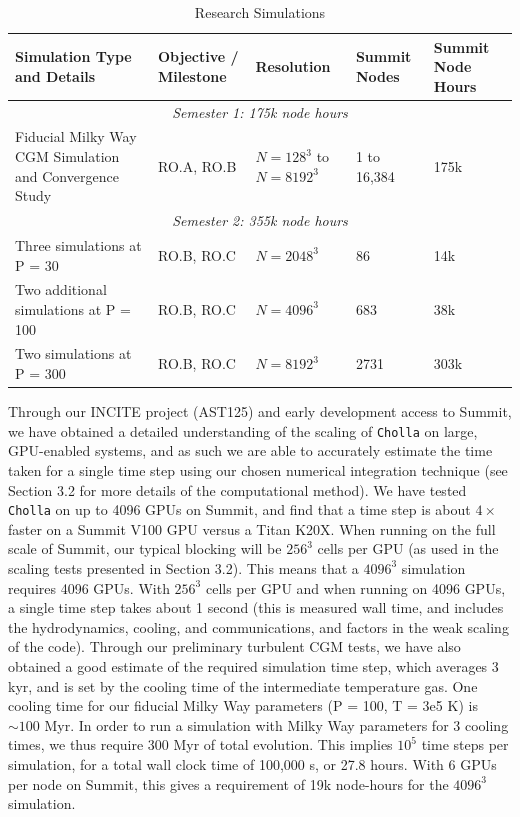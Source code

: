 \documentclass[11pt,letterpaper,english]{article}
\begin{document}
\begin{table}[h]
\caption{Research Simulations}
\label{table:RS}
\begin{tabular}{|p{2.5in}|p{1in}|p{0.7in}|p{0.5in}|p{0.7in}|} 
\hline
{\bf Simulation Type and Details} & {\bf Objective / Milestone} & {\bf Resolution} & {\bf Summit Nodes} & {\bf Summit Node Hours} \\ \hline
\multicolumn{5}{|c|}{\it Semester 1: 175k node hours} \\ \hline
Fiducial Milky Way CGM Simulation and Convergence Study & RO.A, RO.B & $N = 128^3$ to $N=8192^3$ & 1 to 16,384 & 175k \\ \hline
\multicolumn{5}{|c|}{\it Semester 2: 355k node hours} \\ \hline
Three simulations at P = 30 & RO.B, RO.C & $N = 2048^3$ & 86 & 14k\\ \hline
Two additional simulations at P = 100 & RO.B, RO.C & $N=4096^3$ & 683 & 38k \\ \hline
Two simulations at P = 300 & RO.B, RO.C & $N=8192^3$ & 2731 & 303k \\ \hline
\end{tabular}
\end{table}


Through our INCITE project (AST125) and early development access to Summit, we have obtained a detailed understanding of the scaling of {\tt Cholla} on large, GPU-enabled systems, and as such we are able to accurately estimate the time taken for a single time step using our chosen numerical integration technique (see Section 3.2 for more details of the computational method). We have tested {\tt Cholla} on up to 4096 GPUs on Summit, and find that a time step is about $4\times$ faster on a Summit V100 GPU versus a Titan K20X. When running on the full scale of Summit, our typical blocking will be $256^3$ cells per GPU (as used in the scaling tests presented in Section 3.2). This means that a $4096^3$ simulation requires 4096 GPUs. With $256^3$ cells per GPU and when running on 4096 GPUs, a single time step takes about 1 second (this is measured wall time, and includes the hydrodynamics, cooling, and communications, and factors in the weak scaling of the code). Through our preliminary turbulent CGM tests, we have also obtained a good estimate of the required simulation time step, which averages 3 kyr, and is set by the cooling time of the intermediate temperature gas. One cooling time for our fiducial Milky Way parameters (P = 100, T = 3e5 K) is $\sim100$ Myr. In order to run a simulation with Milky Way parameters for 3 cooling times, we thus require 300 Myr of total evolution. This implies $10^5$ time steps per simulation, for a total wall clock time of 100,000 s, or 27.8 hours. With 6 GPUs per node on Summit, this gives a requirement of 19k node-hours for the $4096^3$ simulation.
\end{document}
